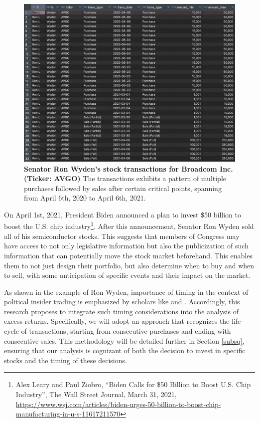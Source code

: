 \documentclass[15pt,letterpaper]{article}
\begin{document}
\begin{figure}[h]
  \centering
  \includegraphics[width=1\textwidth]{imgs/trans.png}
  \caption{\textbf{Senator Ron Wyden's stock transactions for Broadcom Inc. (Ticker: AVGO)} The transactions exhibits a pattern of multiple purchases followed by sales after certain critical points, spanning from April 6th, 2020 to April 6th, 2021.}
  \label{fig:trans}
\end{figure}

On April 1st, 2021, President Biden announced a plan to invest \$50 billion to boost the U.S. chip industry\footnote{Alex Leary and Paul Ziobro, ``Biden Calls for \$50 Billion to Boost U.S. Chip Industry'', The Wall Street Journal, March 31, 2021, \url{https://www.wsj.com/articles/biden-urges-50-billion-to-boost-chip-manufacturing-in-u-s-11617211570}}. After this announcement, Senator Ron Wyden sold all of his semiconductor stocks. This suggests that members of Congress may have access to not only legislative information but also the publicization of such information that can potentially move the stock market beforehand. This enables them to not just design their portfolio, but also determine when to buy and when to sell, with some anticipation of specific events and their impact on the market.

As shown in the example of Ron Wyden, importance of timing in the context of political insider trading is emphasized by scholars like \cite{tahoun2014} and \cite{schweizer2011}. 
Accordingly, this research proposes to integrate such timing considerations into the analysis of excess returns. Specifically, we will adopt an approach that recognizes the life-cycle of transactions, starting from consecutive purchases and ending with consecutive sales. This methodology will be detailed further in Section \ref{subsq}, ensuring that our analysis is cognizant of both the decision to invest in specific stocks and the timing of these decisions.
\end{document}
